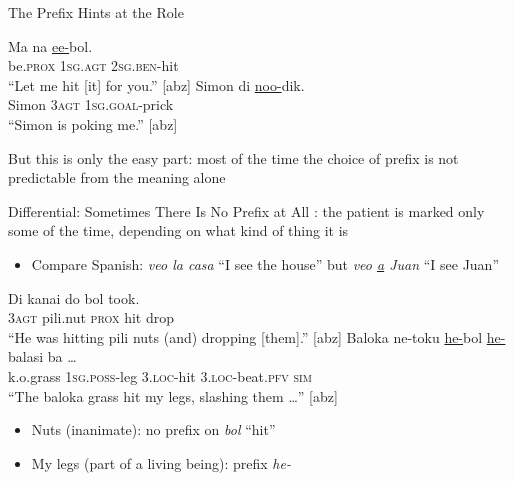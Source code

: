 \documentclass{beamer}
\begin{document}
\begin{frame}{The Prefix Hints at the Role}
  \begin{exe}
    \ex
    \gll Ma na \ul{ee-}bol. \\
         be.\textsc{prox} 1\textsc{sg.agt} 2\textsc{sg.ben}-hit \\
    \trans ``Let me hit [it] for you.'' [abz]
    \ex
    \gll Simon di \ul{noo-}dik. \\
         Simon 3\textsc{agt} 1\textsc{sg.goal}-prick \\
    \trans ``Simon is poking me.'' [abz]
  \end{exe}
  \vfill
  \large
  But this is only the easy part: most of the time the choice of prefix is
  not predictable from the meaning alone
\end{frame}

\begin{frame}{Differential: Sometimes There Is No Prefix at All}
  : the patient is marked only some of the
  time, depending on what kind of thing it is
  \begin{itemize}
  \item Compare Spanish: \emph{veo la casa} ``I see the house'' but
    \emph{veo \ul{a} Juan} ``I see Juan''
  \end{itemize}
  \begin{exe}
    \ex
    \gll Di kanai do bol took. \\
         3\textsc{agt} pili.nut \textsc{prox} hit drop \\
    \trans ``He was hitting pili nuts (and) dropping [them].'' [abz]
    \ex
    \gll Baloka ne-toku \ul{he-}bol \ul{he-}balasi ba \ldots \\
         k.o.grass 1\textsc{sg.poss}-leg 3.\textsc{loc}-hit 3.\textsc{loc}-beat.\textsc{pfv} \textsc{sim} \\
    \trans ``The baloka grass hit my legs, slashing them \ldots'' [abz]
  \end{exe}
  \begin{itemize}
  \item Nuts (inanimate): no prefix on \emph{bol} ``hit''
  \item My legs (part of a living being): prefix \emph{he-}
  \end{itemize}
\end{frame}
\end{document}
